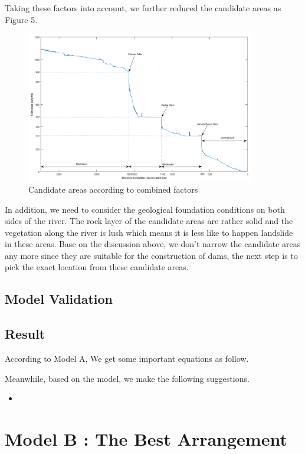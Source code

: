 \documentclass{mcmthesis}
\begin{document}
\indent Taking these factors into account, we further reduced the candidate areas as Figure 5.
\begin{figure}[h]
\small
\centering
\includegraphics[width=10cm]{./figures/dis_alti_v3.png}
\caption{Candidate areas according to combined factors} \label{fig:Fig4}
\end{figure}
\indent In addition, we need to consider the geological foundation conditions on both sides of the river. The rock layer of the candidate areas are rather solid and the vegetation along the river is lush which means it is less like to happen landslide in these areas. Base on the discussion above, we don't narrow the candidate areas any more since they are suitable for the construction of dams, the next step is to pick the exact location from these candidate areas.




\subsection{Model Validation}

\subsection{Result}
\indent \indent According to Model A, We get some important equations as follow.

Meanwhile, based on the model, we make the following suggestions.
\begin{itemize}
  \item 
\end{itemize}


\section{Model B : The Best Arrangement}
\end{document}

